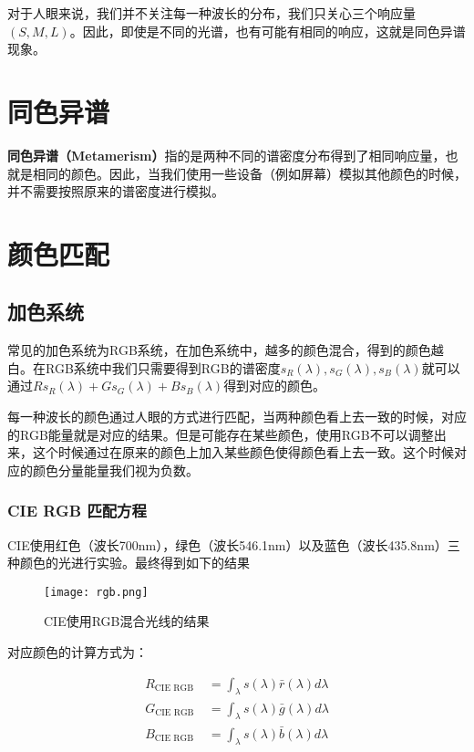 \documentclass[openany]{progbookcn}
\begin{document}
对于人眼来说，我们并不关注每一种波长的分布，我们只关心三个响应量$(S,M,L)$。因此，即使是不同的光谱，也有可能有相同的响应，这就是同色异谱现象。

\section{同色异谱}

\textbf{同色异谱（Metamerism）}指的是两种不同的谱密度分布得到了相同响应量，也就是相同的颜色。因此，当我们使用一些设备（例如屏幕）模拟其他颜色的时候，并不需要按照原来的谱密度进行模拟。

\section{颜色匹配}

\subsection{加色系统}

常见的加色系统为RGB系统，在加色系统中，越多的颜色混合，得到的颜色越白。在RGB系统中我们只需要得到RGB的谱密度$s_R(\lambda), s_G(\lambda), s_B(\lambda)$就可以通过$R s_{R}(\lambda)+G s_{G}(\lambda)+B s_{B}(\lambda)$得到对应的颜色。

每一种波长的颜色通过人眼的方式进行匹配，当两种颜色看上去一致的时候，对应的RGB能量就是对应的结果。但是可能存在某些颜色，使用RGB不可以调整出来，这个时候通过在原来的颜色上加入某些颜色使得颜色看上去一致。这个时候对应的颜色分量能量我们视为负数。

\subsubsection{CIE RGB 匹配方程}

CIE使用红色（波长700nm），绿色（波长546.1nm）以及蓝色（波长435.8nm）三种颜色的光进行实验。最终得到如下的结果

\begin{figure}[H]
	\centering
	\texttt{[image: rgb.png]}
	\caption{CIE使用RGB混合光线的结果}
	\label{fig:rgb}
\end{figure}

对应颜色的计算方式为：

\begin{equation}
	\begin{split}
		R_{\mathrm{CIE} \text { RGB }} &=\int_{\lambda} s(\lambda) \bar{r}(\lambda) d \lambda \\
		G_{\mathrm{CIE} \text { RGB }} &=\int_{\lambda} s(\lambda) \bar{g}(\lambda) d \lambda \\
		B_{\mathrm{CIE} \text { RGB }} &=\int_{\lambda} s(\lambda) \bar{b}(\lambda) d \lambda
	\end{split}
\end{equation}
\end{document}
